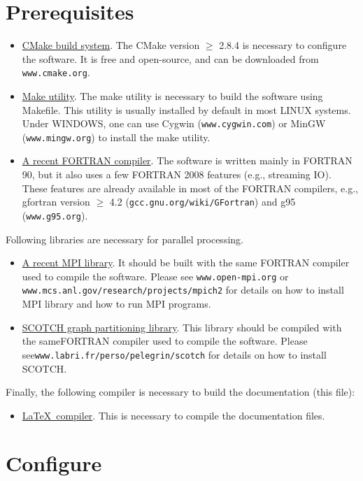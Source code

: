\section{Prerequisites}
\begin{itemize}[-]
  \item \underline{CMake build system}. The CMake version $\ge$ 2.8.4 is necessary to configure the software. It is free and open-source, and can be downloaded from \texttt{www.cmake.org}.
  \item \underline{Make utility}. The make utility is necessary to build the software using Makefile. This utility is usually installed by default in most LINUX systems. Under WINDOWS, one can use Cygwin (\texttt{www.cygwin.com}) or MinGW (\texttt{www.mingw.org}) to install the make utility.
  \item \underline{A recent FORTRAN compiler}. The software is written mainly in FORTRAN 90, but it also uses a few FORTRAN 2008 features (e.g., streaming IO). These features are already available in most of the FORTRAN compilers, e.g., gfortran version $\ge$ 4.2 (\texttt{gcc.gnu.org/wiki/GFortran}) and g95 (\texttt{www.g95.org}).
\end{itemize}
  Following libraries are necessary for parallel processing.
\begin{itemize}[-]
  \item \underline{A recent MPI library}. It should be built with the same FORTRAN compiler used to compile the software. Please see \texttt{www.open-mpi.org} or \linebreak\texttt{www.mcs.anl.gov/research/projects/mpich2} for details on how to install MPI library and how to run MPI programs.
  \item \underline{SCOTCH graph partitioning library}. This library should be compiled with the same\linebreak FORTRAN compiler used to compile the software. Please see\linebreak \texttt{www.labri.fr/perso/pelegrin/scotch} for details on how to install SCOTCH.
\end{itemize}

  Finally, the following compiler is necessary to build the documentation (this file):
\begin{itemize}[-]
  \item \underline{\LaTeX\ compiler}. This is necessary to compile the documentation files.
\end{itemize}

\section{Configure}
\label{sec:configure}

